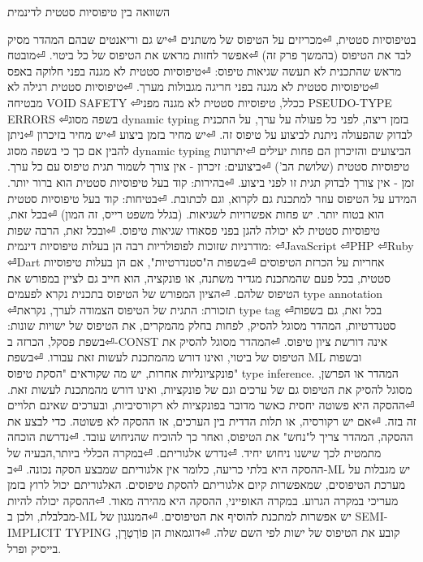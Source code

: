       השוואה בין טיפוסיות סטטית לדינמית
      \begin{ציינון}
\item בטיפוסיות סטטית,
⏎מכריזים על הטיפוס של משתנים
⏎יש גם וריאנטים שבהם המהדר מסיק לבד את הטיפוס (בהמשך פרק זה)
⏎אפשר לחזות מראש את הטיפוס של כל ביטוי.
⏎מובטח מראש שהתכנית לא תעשה שגיאות טיפוס:
⏎טיפוסיות סטטית לא מגנה בפני חלוקה באפס
⏎טיפוסיות סטטית לא מגנה בפני חריגה מגבולות מערך.
⏎טיפוסיות סטטית רגילה לא מבטיחה VOID SAFETY
⏎ככלל, טיפוסיות סטטית לא מגנה מפני PSEUDO-TYPE ERRORS
⏎בשפה מסוג dynamic typing בזמן ריצה, לפני כל פעולה על ערך, על התכנית לבדוק שהפעולה ניתנת לביצוע על טיפוס זה.
⏎יש מחיר בזמן ביצוע
⏎יש מחיר בזיכרון
⏎ניתן להבין אם כך כי בשפה מסוג dynamic typing הביצועים והזיכרון הם פחות יעילים
⏎יתרונות טיפוסיות סטטית (שלושת הב')
⏎ביצועים: זיכרון - אין צורך לשמור תגית טיפוס עם כל ערך. זמן - אין צורך לבדוק תגית זו לפני ביצוע.
⏎בהירות: קוד בעל טיפוסיות סטטית הוא ברור יותר. המידע על הטיפוס עוזר למתכנת גם לקרוא, וגם לכתובת.
⏎בטיחות: קוד בעל טיפוסיות סטטית הוא בטוח יותר. יש פחות אפשרויות לשגיאות. (בגלל משפט רייס, זה המון)
⏎בכל זאת, טיפוסיות סטטית לא יכולה להגן בפני פסאודו שגיאות טיפוס.
⏎ובכל זאת, הרבה שפות מודרניות שזוכות לפופולריות רבה הן בעלות טיפוסיות דינמית:
⏎JavaScript
⏎PHP
⏎Ruby
⏎Dart
      אחריות על הכרזת הטיפוסים
⏎בשפות ה"סטנדרטיות", אם הן בעלות טיפוסיות סטטית, בכל פעם שהמתכנת מגדיר משתנה, או פונקציה, הוא חייב גם לציין במפורש את הטיפוס שלהם.
⏎הציון המפורש של הטיפוס בתכנית נקרא לפעמים type annotation
⏎תזכורת: התגית של הטיפוס הצמודה לערך, נקראת type tag
⏎בכל זאת, גם בשפות סטנדרטיות, המהדר מסוגל להסיק, לפחות בחלק מהמקרים, את הטיפוס של ישויות שונות:
⏎בשפת פסקל, הכרזה ב-CONST אינה דורשת ציון טיפוס.
⏎המהדר מסוגל להסיק את הטיפוס של ביטוי, ואינו דורש מהמתכנת לעשות זאת עבורו.
⏎בשפת ML ובשפות פונקציונליות אחרות, יש מה שקוראים "הסקת טיפוס" type inference. המהדר או הפרשן, מסוגל להסיק את הטיפוס גם של ערכים וגם של פונקציות, ואינו דורש מהמתכנת לעשות זאת.
⏎ההסקה היא פשוטה יחסית כאשר מדובר בפונקציות לא רקורסיביות, ובערכים שאינם תלויים זה בזה.
⏎אם יש רקורסיה, או תלות הדדית בין הערכים, אז ההסקה לא פשוטה. כדי לבצע את ההסקה, המהדר צריך ל"נחש" את הטיפוס, ואחר כך להוכיח שהניחוש עובד.
⏎נדרשת הוכחה מתמטית לכך שישנו ניחוש יחיד.
⏎נדרש אלגוריתם.
⏎במקרה הכללי ביותר,הבעיה של ההסקה היא בלתי כריעה, כלומר אין אלגוריתם שמבצע הסקה נכונה.
⏎ב-ML יש מגבלות על מערכת הטיפוסים, שמאפשרות קיום אלגוריתם להסקת טיפוסים. האלגוריתם יכול לרוץ בזמן מעריכי במקרה הגרוע. במקרה האופייני, ההסקה היא מהירה מאוד.
⏎ההסקה יכולה להיות מבלבלת, ולכן ב-ML יש אפשרות למתכנת להוסיף את הטיפוסים.
⏎המנגנון של SEMI-IMPLICIT TYPING קובע את הטיפוס של ישות לפי השם שלה.
⏎דוגמאות הן פוֹרְטְרָן, בייסיק ופרל.
    \end{ציינון}

